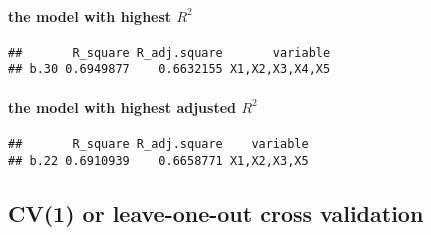 \documentclass[]{article}
\let\oldparagraph\paragraph
\renewcommand{\paragraph}[1]{\oldparagraph{#1}\mbox{}}
\begin{document}
\paragraph{\texorpdfstring{the model with highest
\(R^2\)}{the model with highest R\^{}2}}\label{the-model-with-highest-r2}

\begin{verbatim}
##       R_square R_adj.square       variable
## b.30 0.6949877    0.6632155 X1,X2,X3,X4,X5
\end{verbatim}

\paragraph{\texorpdfstring{the model with highest adjusted
\(R^2\)}{the model with highest adjusted R\^{}2}}\label{the-model-with-highest-adjusted-r2}

\begin{verbatim}
##       R_square R_adj.square    variable
## b.22 0.6910939    0.6658771 X1,X2,X3,X5
\end{verbatim}

\subsection{CV(1) or leave-one-out cross
validation}\label{cv1-or-leave-one-out-cross-validation}
\end{document}
